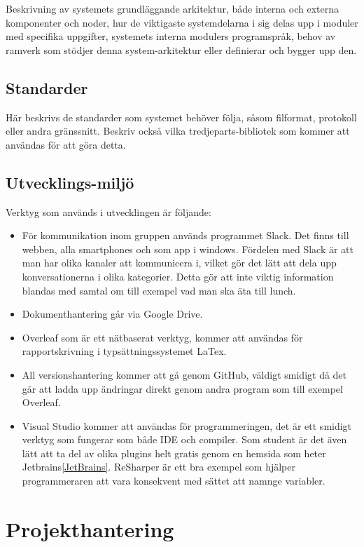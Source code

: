 \documentclass[a4paper,12pt,oneside,final]{extbook}
\begin{document}
Beskrivning av systemets grundläggande arkitektur, både interna och
externa komponenter och noder, hur de viktigaste systemdelarna i sig
delas upp i moduler med specifika uppgifter, systemets interna
modulers programspråk, behov av ramverk som stödjer denna
system-arkitektur eller definierar och bygger upp den.

\section{Standarder}

Här beskrivs de standarder som systemet behöver följa, såsom
filformat, protokoll eller andra gränssnitt. Beskriv också vilka
tredjeparts-bibliotek som kommer att användas för att göra detta.

\section{Utvecklings-miljö}

Verktyg som används i utvecklingen är följande:
\begin{itemize}
    \item För kommunikation inom gruppen används programmet Slack. Det finns till webben, alla smartphones och som app i windows. Fördelen med Slack är att man har olika kanaler att kommunicera i, vilket gör det lätt att dela upp konversationerna i olika kategorier. Detta gör att inte viktig information blandas med samtal om till exempel vad man ska äta till lunch.
    \item Dokumenthantering går via Google Drive.
    \item Overleaf som är ett nätbaserat verktyg, kommer att användas för rapportskrivning i typsättningssystemet LaTex.
    \item All versionshantering kommer att gå genom GitHub, väldigt smidigt då det går att ladda upp ändringar direkt genom andra program som till exempel Overleaf.
    \item Visual Studio kommer att användas för programmeringen, det är ett smidigt verktyg som fungerar som både IDE och compiler. Som student är det även lätt att ta del av olika plugins helt gratis genom en hemsida som heter Jetbrains\ref{JetBrains}. ReSharper är ett bra exempel som hjälper programmeraren att vara konsekvent med sättet att namnge variabler.
\end{itemize}
\chapter{Projekthantering}
\end{document}
